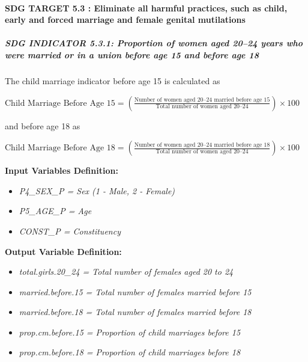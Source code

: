\documentclass[
]{article}
\begin{document}
\paragraph{SDG TARGET 5.3 : Eliminate all harmful practices, such as
child, early and forced marriage and female genital
mutilations}\label{sdg-target-5.3-eliminate-all-harmful-practices-such-as-child-early-and-forced-marriage-and-female-genital-mutilations}

\subparagraph{\texorpdfstring{\textbf{SDG INDICATOR 5.3.1: Proportion of
women aged 20--24 years who were married or in a union before age 15 and
before age
18}}{SDG INDICATOR 5.3.1: Proportion of women aged 20--24 years who were married or in a union before age 15 and before age 18}}\label{sdg-indicator-5.3.1-proportion-of-women-aged-2024-years-who-were-married-or-in-a-union-before-age-15-and-before-age-18}

The child marriage indicator before age 15 is calculated as

\(\text{Child Marriage Before Age 15} = \left( \frac{\text{Number of women aged 20–24 married before age 15}}{\text{Total number of women aged 20–24}} \right) \times 100\)

and before age 18 as

\(\text{Child Marriage Before Age 18} = \left( \frac{\text{Number of women aged 20–24 married before age 18}}{\text{Total number of women aged 20–24}} \right) \times 100\)

\textbf{Input Variables Definition:}

\begin{itemize}
\item
  \emph{P4\_SEX\_P = Sex (1 - Male, 2 - Female)}
\item
  \emph{P5\_AGE\_P = Age}
\item
  \emph{CONST\_P = Constituency}
\end{itemize}

\textbf{Output Variable Definition:}

\begin{itemize}
\item
  \emph{total.girls.20\_24 = Total number of females aged 20 to 24}
\item
  \emph{married.before.15 = Total number of females married before 15}
\item
  \emph{married.before.18 = Total number of females married before 18}
\item
  \emph{prop.cm.before.15 = Proportion of child marriages before 15}
\item
  \emph{prop.cm.before.18 = Proportion of child marriages before 18}
\end{itemize}
\end{document}
